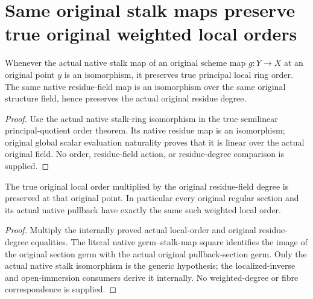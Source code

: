 \section{Same original stalk maps preserve true original weighted local orders}

\begin{theorem}
\label{thm:fc-stalk-map-original-order-residue}
\leanok
{}
Whenever the actual native stalk map of an original scheme map $g:Y\to X$
at an original point $y$ is an isomorphism, it preserves true principal
local ring order.  The same native residue-field map is an isomorphism over
the same original structure field, hence preserves the actual original
residue degree.
\end{theorem}
\begin{proof}
Use the actual native stalk-ring isomorphism in the true semilinear
principal-quotient order theorem.  Its native residue map is an isomorphism;
original global scalar evaluation naturality proves that it is linear over
the actual original field.  No order, residue-field action, or residue-degree
comparison is supplied.
\end{proof}

\begin{theorem}
\label{thm:fc-stalk-map-original-weighted-section-orders}
\leanok
{}
The true original local order multiplied by the original residue-field
degree is preserved at that original point.  In particular every original
regular section and its actual native pullback have exactly the same such
weighted local order.
\end{theorem}
\begin{proof}
Multiply the internally proved actual local-order and original residue-degree
equalities.  The literal native germ--stalk-map square identifies the image
of the original section germ with the actual original pullback-section
germ.  Only the actual native stalk isomorphism is the generic hypothesis;
the localized-inverse and open-immersion consumers derive it internally.
No weighted-degree or fibre correspondence is supplied.
\end{proof}
